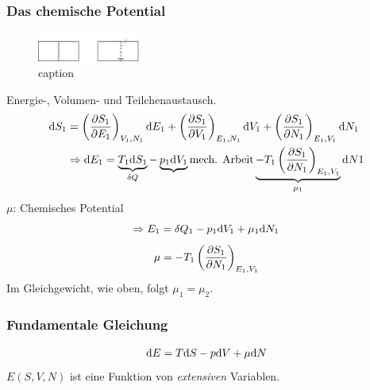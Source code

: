 \subsubsection{Das chemische Potential}
\begin{figure}[H]
    \begin{center}
        \includegraphics[width=0.3\textwidth]{../img/derivationMu.pdf}
        \caption{caption}  %
        \label{img:derivationMu}
    \end{center}
\end{figure}
Energie-, Volumen- und Teilchenaustausch.
\begin{equation}
    \begin{split}
        \mathrm{d} S_1 &= \left( \frac{\partial S_1}{\partial E_1} \right)_{V_1, N_1} \mathrm{d} E_1 + \left( \frac{\partial S_1}{\partial V_1} \right)_{E_1, N_1} \mathrm{d} V_1 + \left( \frac{\partial S_1}{\partial N_1} \right)_{E_1, V_1} \mathrm{d} N_1 \\
        & \Rightarrow \mathrm{d} E_1 = \underbrace{T_1 \mathrm{d} S_1}_{\delta Q} - \underbrace{p_1 \mathrm{d} V_1}{\text{mech. Arbeit}}
        \underbrace{- T_1 \left( \frac{\partial S_1}{\partial N_1} \right)_{E_1, V_1}}_{\mu_1} \mathrm{d} N1
    \end{split}
\end{equation}
$\mu$: Chemisches Potential
\begin{equation}
    \Rightarrow E_1 = \delta Q_1 - p_1 \mathrm{d} V_1 + \mu_1 \mathrm{d} N_1
\end{equation}
\begin{equation}
    \mu = - T_1 \left( \frac{\partial S_1}{\partial N_1} \right)_{E_1, V_1}
\end{equation}
Im Gleichgewicht, wie oben, folgt $\mu_1 = \mu_2$.

\subsubsection{Fundamentale Gleichung}
\begin{equation}
    \label{eq:fundamentalEQ}
    \mathrm{d} E = T \mathrm{d} S - p \mathrm{d} V + \mu \mathrm{d} N
\end{equation}
$E(S, V, N)$ ist eine Funktion von \emph{extensiven} Variablen.

